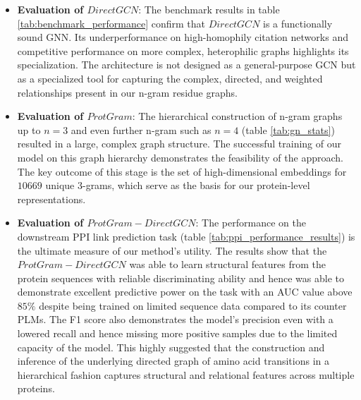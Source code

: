 \documentclass[utf8]{article}
\begin{document}
	\begin{itemize}
		\item \textbf{Evaluation of $DirectGCN$}: The benchmark results in table \ref{tab:benchmark_performance} confirm that $DirectGCN$ is a functionally sound GNN. Its underperformance on high-homophily citation networks and competitive performance on more complex, heterophilic graphs highlights its specialization. The architecture is not designed as a general-purpose GCN but as a specialized tool for capturing the complex, directed, and weighted relationships present in our n-gram residue graphs.
		
		\item \textbf{Evaluation of $ProtGram$}: The hierarchical construction of n-gram graphs up to $n=3$ and even further n-gram such as $n=4$ (table \ref{tab:gn_stats}) resulted in a large, complex graph structure. The successful training of our model on this graph hierarchy demonstrates the feasibility of the approach. The key outcome of this stage is the set of high-dimensional embeddings for $10669$ unique 3-grams, which serve as the basis for our protein-level representations.
		
		\item \textbf{Evaluation of $ProtGram-DirectGCN$}: The performance on the downstream PPI link prediction task (table \ref{tab:ppi_performance_results}) is the ultimate measure of our method's utility.
		The results show that the $ProtGram-DirectGCN$ was able to learn structural features from the protein sequences with reliable discriminating ability and hence was able to demonstrate excellent predictive power on the task with an AUC value above $85\%$ despite being trained on limited sequence data compared to its counter PLMs. The F1 score also demonstrates the model's precision even with a lowered recall and hence missing more positive samples due to the limited capacity of the model. This highly suggested that the construction and inference of the underlying directed graph of amino acid transitions in a hierarchical fashion captures structural and relational features across multiple proteins.
		

\end{itemize}
\end{document}
